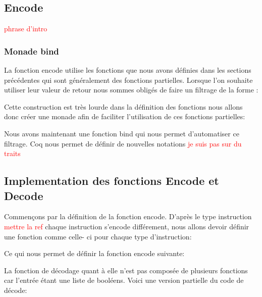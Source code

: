 \documentclass {article}
\newcommand{\codefrom}[3]
           {}
\theoremstyle{definition}
\theoremstyle{remark}
\newcommand{\todo}[1]{\textcolor{red}{#1}}
\begin{document}
\subsection{Encode}

\todo{phrase d'intro}

\subsubsection{Monade bind}

La fonction encode utilise les fonctions que nous avons définies dans les sections précédentes qui sont généralement
des fonctions partielles. Lorsque l'on souhaite utiliser leur valeur de retour nous sommes obligés de faire un
filtrage de la forme :

\codefrom{rapport}{definitions}{pattern_matching}

Cette construction est très lourde dans la définition des fonctions nous allons donc créer une monade
afin de faciliter l'utilisation de ces fonctions partielles:

\codefrom{src}{encode}{monade}

Nous avons maintenant une fonction bind qui nous permet d'automatiser ce filtrage. Coq nous permet de
définir de nouvelles notations \todo{je suis pas sur du traits}

\codefrom{src}{encode}{notation}






\subsection{Implementation des fonctions Encode et Decode}

Commençons par la définition de la fonction encode. D'après le type instruction \todo{mettre la ref}
chaque instruction s'encode différement, nous allons devoir définir une fonction comme celle- ci
pour chaque type d'instruction:

\codefrom{src}{encode}{encode_t_n}

Ce qui nous permet de définir la fonction encode suivante:

\codefrom{src}{encode}{encode}

La fonction de décodage quant à elle n'est pas composée de plusieurs fonctions car l'entrée
étant une liste de booléens.
Voici une version partielle du code de décode:

\codefrom{src}{encode}{decode}
\end{document}
